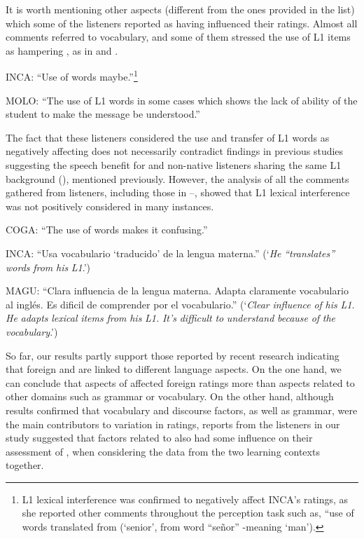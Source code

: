 \documentclass[output=paper]{langsci/langscibook}
\begin{document}
It is worth mentioning other aspects (different from the ones provided in the list) which some of the listeners reported as having influenced their  ratings. Almost all comments referred to vocabulary, and some of them stressed the use of {L1} items as hampering , as in  
 and . 

 
\ea\label{ex:delrio:2}
INCA: “Use of  words maybe.”\footnote{L1 lexical interference was confirmed to negatively affect INCA’s  ratings, as she reported other comments throughout the perception task such as, “use of words translated from  (‘senior’, from  word “señor” -meaning ‘man’).} \\
\z

  
\ea\label{ex:delrio:3}
MOLO: “The use of {L1} words in some cases which shows the lack of ability of the student to make the message be understood.”
\z

The fact that these listeners considered the use and transfer of {L1} words as negatively affecting  does not necessarily contradict findings in previous studies suggesting the speech  benefit for  and non-native listeners sharing the same {L1} background (\citealt{Hayes-HarbEtAl2008,GallardodelPuertoEtAl2009}), mentioned previously. However, the analysis of all the comments gathered from listeners, including those in --, showed that {L1} lexical interference was not positively considered in many instances.

\ea\label{ex:delrio:4}
COGA: “The use of  words makes it confusing.”
\z

\ea\label{ex:delrio:5}
INCA: “Usa vocabulario ‘traducido’ de la lengua materna.” (‘\textit{He} \textit{“translates”} \textit{words} \textit{from} \textit{his} \textit{L1}.’) 
\z

\ea\label{ex:delrio:6}
MAGU: “Clara influencia de la lengua materna. Adapta claramente vocabulario al inglés. Es dificil de comprender por el vocabulario.” (‘\textit{Clear} \textit{influence} \textit{of} \textit{his} \textit{L1.} \textit{He} \textit{adapts} \textit{lexical} \textit{items} \textit{from} \textit{his} \textit{L1.} \textit{It’s} \textit{difficult} \textit{to} \textit{understand} \textit{because} \textit{of} \textit{the} \textit{vocabulary}.’)
\z

So far, our results partly support those reported by recent research indicating that foreign  and  are linked to different language aspects. On the one hand, we can conclude that aspects of  affected foreign  ratings more than aspects related to other domains such as grammar or vocabulary. On the other hand, although results confirmed that vocabulary and discourse factors, as well as grammar, were the main contributors to variation in  ratings, reports from the listeners in our study suggested that factors related to  also had some influence on their assessment of , when considering the data from the two learning contexts together. 
\end{document}
